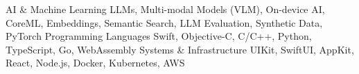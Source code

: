 \begin{cvskills}
  \cvskill
    {AI \& Machine Learning}
    {LLMs, Multi-modal Models (VLM), On-device AI, CoreML, Embeddings, Semantic Search, LLM Evaluation, Synthetic Data, PyTorch}
  \cvskill
    {Programming Languages}
    {Swift, Objective-C, C/C++, Python, TypeScript, Go, WebAssembly}
  \cvskill
    {Systems \& Infrastructure}
    {UIKit, SwiftUI, AppKit, React, Node.js, Docker, Kubernetes, AWS}
\end{cvskills}
